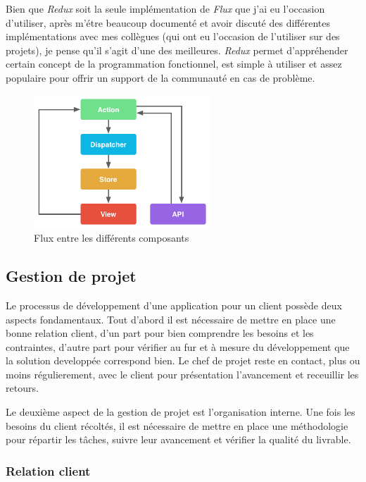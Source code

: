 \bigskip

Bien que \emph{Redux} soit la seule implémentation de \emph{Flux} que
j'ai eu l'occasion d'utiliser, après m'étre beaucoup documenté et avoir
discuté des différentes implémentations avec mes collègues (qui ont eu
l'occasion de l'utiliser sur des projets), je pense qu'il s'agit d'une
des meilleures. \emph{Redux} permet d'appréhender certain concept de la
programmation fonctionnel, est simple à utiliser et assez populaire pour
offrir un support de la communauté en cas de problème.

\bigskip

\begin{figure}[h]
  \centering
  \includegraphics[height=5cm]{figures/react.png}
  \caption{Flux entre les différents composants}
\end{figure}

\subsection{Gestion de projet}\label{gestion-de-projet}

Le processus de développement d'une application pour un client possède
deux aspects fondamentaux. Tout d'abord il est nécessaire de mettre en
place une bonne relation client, d'un part pour bien comprendre les
besoins et les contraintes, d'autre part pour vérifier au fur et à
mesure du développement que la solution developpée correspond bien. Le
chef de projet reste en contact, plus ou moins régulierement, avec le
client pour présentation l'avancement et receuillir les retours.

\bigskip

Le deuxième aspect de la gestion de projet est l'organisation interne.
Une fois les besoins du client récoltés, il est nécessaire de mettre en
place une méthodologie pour répartir les tâches, suivre leur avancement
et vérifier la qualité du livrable.

\bigskip

\subsubsection{Relation client}\label{relation-client}

